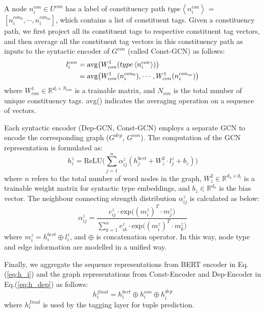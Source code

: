 \documentclass[11pt]{article}
\begin{document}
A node $n^{con}_i \in U^{con}$ has a label of constituency path $type\left<n_i^{con}\right>$ = $[n_i^{con_0}, \cdots, n_i^{con_m}]$, which contains a list of constituent tags. Given a constituency path, we first project all its constituent tags to respective constituent tag vectors, and then average all the constituent tag vectors in this constituency path as inputs to the syntactic encoder of $G^{con}$ (called Const-GCN) as follows:
\begin{align}
    l^{con}_{i} &= \mathrm{avg} \big( W_{con}^1(type\left<n_i^{con}\right>) \big) \\
    &= \mathrm{avg} \big(W_{con}^1(n_i^{con_0}), \cdots, W_{con}^1(n_i^{con_m}) \big) \notag
\end{align}
where $W_{con}^1 \in \mathbb{R} ^ {d_l \times N_{con}}$ is a trainable matrix, and $N_{con}$ is the total number of unique constituency tags. avg() indicates the averaging operation on a sequence of vectors. 


Each syntactic encoder (Dep-GCN, Const-GCN) employs a separate GCN to encode the corresponding graph ($G^{dep}$, $G^{con}$). The computation of the GCN representation is formulated as:
\begin{equation}\label{eq:h_dep}
    h_i^{z} = \mathrm{ReLU}\Big(\sum_{j=1}^{n} \alpha^{z}_{ij}(h_j^{bert} + W_z^2 \cdot l^{z}_{j} + b_z) \Big)
\end{equation}
where $n$ refers to the total number of word nodes in the graph, $W_z^2  \in \mathbb{R} ^ {d_h \times d_l}$ is a trainable weight matrix for syntactic type embeddings, and $b_z  \in \mathbb{R} ^ {d_h}$ is the bias vector. The neighbour connecting strength distribution $\alpha^{z}_{ij}$ is calculated as below:
\begin{equation}
    \alpha^{z}_{ij} = \frac{e^{z}_{ij} \cdot \mathrm{exp}\big( (m_i^{z})^T \cdot m_j^{z} \big)}{\sum_{k=1}^{n}e^{z}_{ik} \cdot \mathrm{exp} \big( (m_i^{z})^T \cdot m_k^{z} \big)}
\end{equation}
where $m_i^{z} = h_i^{bert} \oplus l^{z}_{i}$, and $\oplus$ is concatenation operator.
In this way, node type and edge information are modelled in a unified way.


Finally, we aggregate the sequence representations from BERT encoder in Eq.(\ref{eq:h_i}) and the graph representations from Const-Encoder and Dep-Encoder in Eq.(\ref{eq:h_dep}) as follows:
\begin{equation} 
    h_i^{final} =  h_i^{bert} \oplus h_i^{con} \oplus h_i^{dep}
\end{equation}
where $h_i^{final}$ is used by the tagging layer for tuple prediction.
\end{document}
